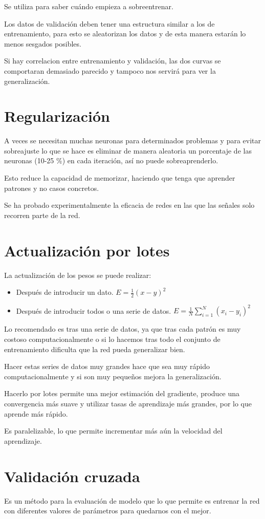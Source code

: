 \documentclass[12pt, twoside, openright]{report} %
\begin{document}
Se utiliza para saber cuándo empieza a sobreentrenar.

Los datos de validación deben tener una estructura similar a los de entrenamiento, para esto se aleatorizan los datos y de esta manera estarán lo menos sesgados posibles.

Si hay correlacion entre entrenamiento y validación, las dos curvas se comportaran demasiado parecido y tampoco nos servirá para ver la generalización.

\section{Regularización}
A veces se necesitan muchas neuronas para determinados problemas y para evitar sobreajuste lo que se hace es eliminar de manera aleatoria un porcentaje de las neuronas (10-25 \%) en cada iteración, así no puede sobreaprenderlo.

Esto reduce la capacidad de memorizar, haciendo que tenga que aprender patrones y no casos concretos.

Se ha probado experimentalmente la eficacia de redes en las que las señales solo recorren parte de la red.

\section{Actualización por lotes}
La actualización de los pesos se puede realizar:
\begin{itemize}
	\item Después de introducir un dato. $E= \frac{1}{2} (x-y)^2$
	\item Después de introducir todos o una serie de datos. $E= \frac{1}{N} \sum_{i=1}^N(x_i-y_i)^2$
\end{itemize}
Lo recomendado es tras una serie de datos, ya que tras cada patrón es muy costoso computacionalmente o si lo hacemos tras todo el conjunto de entrenamiento dificulta que la red pueda generalizar bien.

Hacer estas series de datos muy grandes hace que sea muy rápido computacionalmente y si son muy pequeños mejora la generalización.

Hacerlo por lotes permite una mejor estimación del gradiente, produce una convergencia más suave y utilizar tasas de aprendizaje más grandes, por lo que aprende más rápido.

Es paralelizable, lo que permite incrementar más aún la velocidad del aprendizaje.

\section{Validación cruzada}
Es un método para la evaluación de modelo que lo que permite es entrenar la red con diferentes valores de parámetros para quedarnos con el mejor. 
\end{document}
